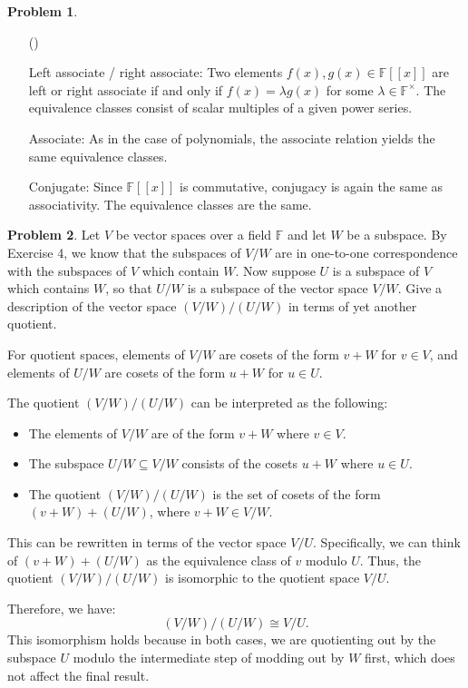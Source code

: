 \documentclass[12pt]{article}
\theoremstyle{definition}
\newtheorem{problem}{Problem}
\newcounter{subq}[problem]
\newenvironment{subproblem}
{\refstepcounter{subq} \begin{itemize} \item[(\alph{subq})]}
{\end{itemize} \medskip}
\begin{document}
\begin{problem}
\begin{subproblem}
\begin{solution}
            Left associate / right associate: Two elements \( f(x), g(x) \in \mathbb{F}[[x]] \) are left or right associate if and only if \( f(x) = \lambda g(x) \) for some \( \lambda \in \mathbb{F}^\times \). The equivalence classes consist of scalar multiples of a given power series.
            
            Associate: As in the case of polynomials, the associate relation yields the same equivalence classes.
            
            Conjugate: Since \( \mathbb{F}[[x]] \) is commutative, conjugacy is again the same as associativity. The equivalence classes are the same.
        \end{solution}
    \end{subproblem}
\end{problem}

\begin{problem}
    Let $V$ be vector spaces over a field $\mathbb{F}$ and let $W$ be a subspace. By Exercise 4, we know that the subspaces of $V/W$ are in one-to-one
    correspondence with the subspaces of $V$ which contain $W$. Now suppose $U$ is a subspace of $V$ which contains $W$, so that $U/W$ is a subspace of the vector space $V/W$.
    Give a description of the vector space $(V/W)/(U/W)$ in terms of yet another quotient. 

    \begin{solution}
        For quotient spaces, elements of \( V/W \) are cosets of the form \( v + W \) for \( v \in V \), and elements of \( U/W \) are cosets of the form \( u + W \) for \( u \in U \).

        The quotient \( (V/W)/(U/W) \) can be interpreted as the following:
        \begin{itemize}
            \item The elements of \( V/W \) are of the form \( v + W \) where \( v \in V \).
            \item The subspace \( U/W \subseteq V/W \) consists of the cosets \( u + W \) where \( u \in U \).
            \item The quotient \( (V/W)/(U/W) \) is the set of cosets of the form \( (v + W) + (U/W) \), where \( v + W \in V/W \).
        \end{itemize}
        This can be rewritten in terms of the vector space \( V/U \). Specifically, we can think of \( (v + W) + (U/W) \) as the equivalence class of \( v \) modulo \( U \). Thus, the quotient \( (V/W)/(U/W) \) is isomorphic to the quotient space \( V/U \).

        Therefore, we have:
        \[
        (V/W)/(U/W) \cong V/U.
        \]
        This isomorphism holds because in both cases, we are quotienting out by the subspace \( U \) modulo the intermediate step of modding out by \( W \) first, which does not affect the final result.
    \end{solution}
\end{problem}
\end{document}
